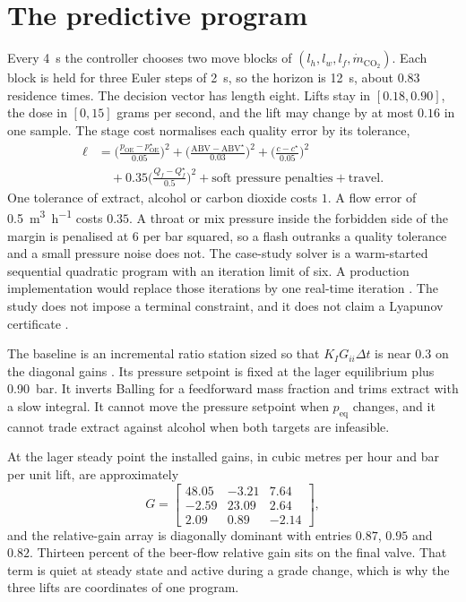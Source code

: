 \documentclass[11pt,a4paper]{article}
\begin{document}
\section{The predictive program}
Every \SI{4}{\second} the controller chooses two move blocks of $(l_h,l_w,l_f,\dot m_{\mathrm{CO_2}})$. Each block is held for three Euler steps of \SI{2}{\second}, so the horizon is \SI{12}{\second}, about $0.83$ residence times. The decision vector has length eight. Lifts stay in $[0.18,0.90]$, the dose in $[0,15]$ grams per second, and the lift may change by at most $0.16$ in one sample. The stage cost normalises each quality error by its tolerance,
\begin{equation}
\begin{aligned}
\ell
&=
\Big(\frac{p_{\mathrm{OE}}-p_{\mathrm{OE}}^{\star}}{0.05}\Big)^{2}
+
\Big(\frac{\mathrm{ABV}-\mathrm{ABV}^{\star}}{0.03}\Big)^{2}
+
\Big(\frac{c-c^{\star}}{0.05}\Big)^{2}\\
&\quad
+0.35\Big(\frac{Q_f-Q_f^{\star}}{0.5}\Big)^{2}
+
\text{soft pressure penalties}
+
\text{travel}.
\end{aligned}
\end{equation}
One tolerance of extract, alcohol or carbon dioxide costs $1$. A flow error of \SI{0.5}{\cubic\metre\per\hour} costs $0.35$. A throat or mix pressure inside the forbidden side of the margin is penalised at $6$ per bar squared, so a flash outranks a quality tolerance and a small pressure noise does not. The case-study solver is a warm-started sequential quadratic program with an iteration limit of six. A production implementation would replace those iterations by one real-time iteration \citep{diehl2005,rawlings2017}. The study does not impose a terminal constraint, and it does not claim a Lyapunov certificate \citep{mayne2000}.

The baseline is an incremental ratio station sized so that $K_I G_{ii}\Delta t$ is near $0.3$ on the diagonal gains \citep{skogestad2003}. Its pressure setpoint is fixed at the lager equilibrium plus \SI{0.90}{bar}. It inverts Balling for a feedforward mass fraction and trims extract with a slow integral. It cannot move the pressure setpoint when $p_{\mathrm{eq}}$ changes, and it cannot trade extract against alcohol when both targets are infeasible.

At the lager steady point the installed gains, in cubic metres per hour and bar per unit lift, are approximately
\begin{equation}
G
=
\begin{bmatrix}
48.05 & -3.21 & 7.64\\
-2.59 & 23.09 & 2.64\\
2.09 & 0.89 & -2.14
\end{bmatrix},
\end{equation}
and the relative-gain array is diagonally dominant with entries $0.87$, $0.95$ and $0.82$. Thirteen percent of the beer-flow relative gain sits on the final valve. That term is quiet at steady state and active during a grade change, which is why the three lifts are coordinates of one program.
\end{document}
